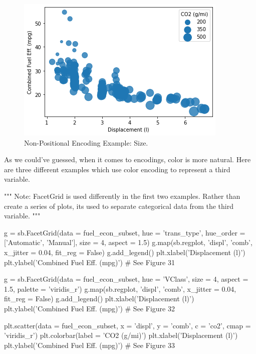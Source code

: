 \begin{figure}
	\includegraphics{images/figure30.png}
	\caption{Non-Positional Encoding Example: Size.}\label{fig:figure30}
\end{figure}

\newpage
As we could've guessed, when it comes to encodings, color is more natural. Here are three different examples which use color encoding to represent a third variable.

\begin{python}
	"""
	Note: FacetGrid is used differently in the first two examples. Rather than create a series of plots, its used to separate categorical data from the third variable.
	"""
	
	g = sb.FacetGrid(data = fuel_econ_subset, hue = 'trans_type', hue_order = ['Automatic', 'Manual'], size = 4, aspect = 1.5)
	g.map(sb.regplot, 'displ', 'comb', x_jitter = 0.04, fit_reg = False)
	g.add_legend()
	plt.xlabel('Displacement (l)')
	plt.ylabel('Combined Fuel Eff. (mpg)')
	# See Figure 31
	
	g = sb.FacetGrid(data = fuel_econ_subset, hue = 'VClass', size = 4, aspect = 1.5, palette = 'viridis_r')
	g.map(sb.regplot, 'displ', 'comb', x_jitter = 0.04, fit_reg = False)
	g.add_legend()
	plt.xlabel('Displacement (l)')
	plt.ylabel('Combined Fuel Eff. (mpg)')
	# See Figure 32
	
	plt.scatter(data = fuel_econ_subset, x = 'displ', y = 'comb', c = 'co2', cmap = 'viridis_r')
	plt.colorbar(label = 'CO2 (g/mi)')
	plt.xlabel('Displacement (l)')
	plt.ylabel('Combined Fuel Eff. (mpg)')
	# See Figure 33
\end{python}

